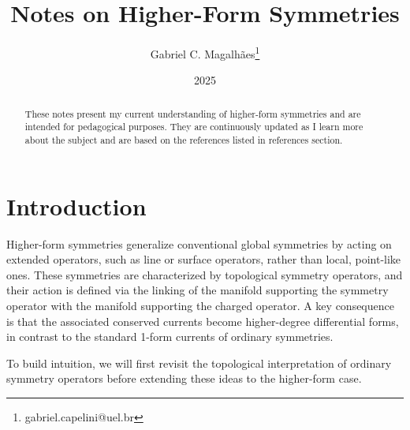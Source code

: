 \documentclass{article}
\title{Notes on Higher-Form Symmetries}
\author{Gabriel C. Magalhães\footnote{gabriel.capelini@uel.br}}
\date{2025}
\begin{document}
\maketitle

\begin{abstract}
These notes present  my current understanding of higher-form symmetries and are intended for pedagogical purposes. They are continuously updated as I learn more about the subject and are based on the references listed in references section.
\end{abstract}

\tableofcontents
\pagebreak

\section{Introduction}
Higher-form symmetries generalize conventional global symmetries by acting on extended operators, such as line or surface operators, rather than local, point-like ones. These symmetries are characterized by topological symmetry operators, and their action is defined via the linking of the manifold supporting the symmetry operator with the manifold supporting the charged operator. A key consequence is that the associated conserved currents become higher-degree differential forms, in contrast to the standard 1-form currents of ordinary symmetries.

To build intuition, we will first revisit the topological interpretation of ordinary symmetry operators before extending these ideas to the higher-form case.
\end{document}
